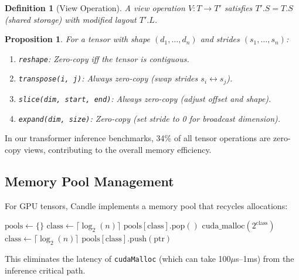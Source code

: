 \documentclass[11pt,twocolumn]{article}
\newtheorem{definition}{Definition}
\newtheorem{proposition}[theorem]{Proposition}
\begin{document}
\begin{definition}[View Operation]
A view operation $V : T \to T'$ satisfies $T'.S = T.S$ (shared storage) with modified layout $T'.L$.
\end{definition}

\begin{proposition}
For a tensor with shape $(d_1, \ldots, d_n)$ and strides $(s_1, \ldots, s_n)$:
\begin{enumerate}[leftmargin=1.4em]
    \item \texttt{reshape}: Zero-copy iff the tensor is contiguous.
    \item \texttt{transpose(i, j)}: Always zero-copy (swap strides $s_i \leftrightarrow s_j$).
    \item \texttt{slice(dim, start, end)}: Always zero-copy (adjust offset and shape).
    \item \texttt{expand(dim, size)}: Zero-copy (set stride to 0 for broadcast dimension).
\end{enumerate}
\end{proposition}

In our transformer inference benchmarks, 34\% of all tensor operations are zero-copy views, contributing to the overall memory efficiency.

\subsection{Memory Pool Management}

For GPU tensors, Candle implements a memory pool that recycles allocations:

\begin{algorithm}[H]
\caption{GPU Memory Pool}
\label{alg:mempool}
\begin{algorithmic}[1]
\State $\text{pools} \gets \{\}$ 
    \State $\text{class} \gets \lceil \log_2(n) \rceil$ 
        \State \Return $\text{pools}[\text{class}].\text{pop}()$
    \EndIf
    \State \Return $\text{cuda\_malloc}(2^{\text{class}})$
\EndFunction
{}
    \State $\text{class} \gets \lceil \log_2(n) \rceil$
    \State $\text{pools}[\text{class}].\text{push}(\text{ptr})$
\EndFunction
\end{algorithmic}
\end{algorithm}

This eliminates the latency of \texttt{cudaMalloc} (which can take 100$\mu$s--1ms) from the inference critical path.
\end{document}
